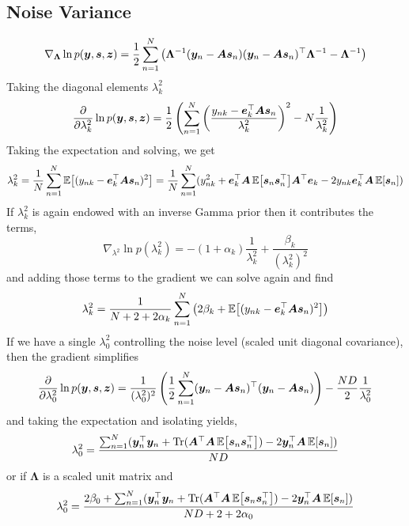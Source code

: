 \documentclass{article}
\newcommand{\mix}{\bm{A}}
\newcommand{\source}{s}
\newcommand{\sourcevec}{\bm{\source}}
\newcommand{\obs}{y}
\newcommand{\obsvec}{\bm{\obs}}
\newcommand{\assign}{z}
\newcommand{\assignvec}{\bm{\assign}}
\newcommand{\noisecov}{\bm{\Lambda}}
\newcommand{\noisescalesq}{\lambda^2}
\begin{document}
\subsection{Noise Variance}
\begin{equation}
\nabla_{\noisecov}\ln p(\obsvec,\sourcevec,\assignvec)=\frac{1}{2}\sum_{n=1}^{N}\left(\noisecov^{-1}(\obsvec_n-\mix\sourcevec_n)(\obsvec_n-\mix\sourcevec_n)\T\noisecov^{-1}-\noisecov^{-1}\right)
\end{equation}
Taking the diagonal elements $\noisescalesq_k$
\begin{equation}
\pdv{\noisescalesq_{k}}\ln p(\obsvec,\sourcevec,\assignvec)=\frac{1}{2}\left(\sum_{n=1}^{N}\left(\frac{\obs_{nk}-\bm{e}_k\T\mix\sourcevec_n}{\noisescalesq_{k}}\right)^2-N\frac{1}{\noisescalesq_k}\right)
\end{equation}
Taking the expectation and solving, we get
\begin{equation}
\noisescalesq_k=\frac{1}{N}\sum_{n=1}^{N}\E{(\obs_{nk}-\bm{e}_k\T\mix\sourcevec_n)^2}=\frac{1}{N}\sum_{n=1}^{N}(\obs_{nk}^2+\bm{e}_k\T\mix\E{\sourcevec_n\sourcevec_n\T}\mix\T\bm{e}_k-2\obs_{nk}\bm{e}_k\T\mix\E{\sourcevec_n})
\end{equation}
If $\noisescalesq_k$ is again endowed with an inverse Gamma prior then it contributes the terms,
\begin{equation}
\nabla_{\noisescalesq}\ln p(\noisescalesq_k)=-(1+\alpha_k)\frac{1}{\noisescalesq_k}+\frac{\beta_k}{(\noisescalesq_k)^2}
\end{equation}
and adding those terms to the gradient we can solve again and find
\begin{equation*}
\noisescalesq_k=\frac{1}{N+2+2\alpha_k}\sum_{n=1}^{N}\left(2\beta_k+\E{(\obs_{nk}-\bm{e}_k\T\mix\sourcevec_n)^2}\right)
\end{equation*}
If we have a single $\noisescalesq_0$ controlling the noise level (scaled unit diagonal covariance), then the gradient simplifies
\begin{equation}
\pdv{\noisescalesq_{0}}\ln p(\obsvec,\sourcevec,\assignvec)=\frac{1}{(\noisescalesq_0)^2}\left(\frac{1}{2}\sum_{n=1}^{N}(\obsvec_n-\mix\sourcevec_n)\T(\obsvec_n-\mix\sourcevec_n)\right)-\frac{ND}{2}\frac{1}{\noisescalesq_0}
\end{equation}
and taking the expectation and isolating yields,
\begin{equation}
\noisescalesq_0=\frac{\sum_{n=1}^{N}(\obsvec_n\T\obsvec_n+\Trace(\mix\T\mix\E{\sourcevec_n\sourcevec_n\T})-2\obsvec_n\T\mix\E{\sourcevec_n})}{ND}
\end{equation}
or if $\noisecov$ is a scaled unit matrix and 
\begin{equation}
\noisescalesq_0=\frac{2\beta_0+\sum_{n=1}^{N}(\obsvec_n\T\obsvec_n+\Trace(\mix\T\mix\E{\sourcevec_n\sourcevec_n\T})-2\obsvec_n\T\mix\E{\sourcevec_n})}{ND+2+2\alpha_0}
\end{equation}
\end{document}
